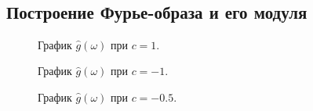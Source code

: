 \documentclass[a5paper, 10pt]{article}
\theoremstyle{definition}
\theoremstyle{plain}
\theoremstyle{remark}
\begin{document}
\newpage
\,
\newpage
\subsection{Построение Фурье-образа и его модуля}

\begin{figure}[h!]
\caption{График $\hat{g}(\omega)$ при $c = 1$.}
\end{figure}


\begin{figure}[h!]
\caption{График $\hat{g}(\omega)$ при $c = -1$.}
\caption{График $\hat{g}(\omega)$ при $c = -0.5$.}
\end{figure}
\end{document}
